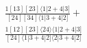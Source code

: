 \documentclass[varwidth, border=5pt]{standalone}
\begin{document}
\begin{my}
$\begin{gathered}
\scriptscriptstyle\frac{1[13][23]⟨1|2+4|3]}{[24][34]⟨1|3+4|2]} +\\
\scriptscriptstyle\frac{1[12][23]⟨24⟩⟨1|2+4|3]}{[24]⟨1|3+4|2]⟨2|3+4|2]} \phantom{+}
\end{gathered}$
\end{my}
\end{document}
